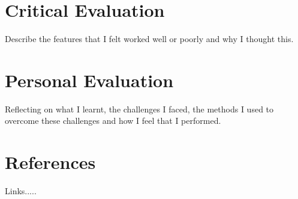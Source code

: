 \documentclass[10pt, a4paper]{article}
\begin{document}
    
    
    
    
    
    
    
    
    
    
    
    
    \section{Critical Evaluation}
    Describe the features that I felt worked well or poorly and why I thought this.
    
    \section{Personal Evaluation}
   Reflecting on what I learnt, the challenges I faced, the methods I used to overcome these challenges and how I feel that I performed.
   
   \section{References}
   Links.....
   
   
\end{document}

